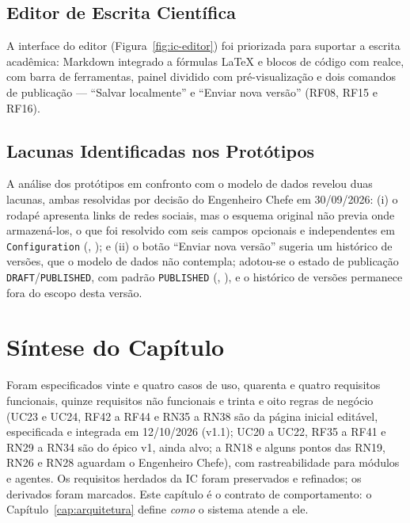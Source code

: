 \subsection{Editor de Escrita Científica}

A interface do editor (Figura~\ref{fig:ic-editor}) foi priorizada para suportar a escrita acadêmica: Markdown integrado a fórmulas \LaTeX{} e blocos de código com realce, com barra de ferramentas, painel dividido com pré-visualização e dois comandos de publicação --- ``Salvar localmente'' e ``Enviar nova versão'' (RF08, RF15 e RF16).


\subsection{Lacunas Identificadas nos Protótipos}

A análise dos protótipos em confronto com o modelo de dados revelou duas lacunas, ambas resolvidas por decisão do Engenheiro Chefe em 30/09/2026: (i) o rodapé apresenta links de redes sociais, mas o esquema original não previa onde armazená-los, o que foi resolvido com seis campos opcionais e independentes em \texttt{Configuration} (, ); e (ii) o botão ``Enviar nova versão'' sugeria um histórico de versões, que o modelo de dados não contempla; adotou-se o estado de publicação \texttt{DRAFT}/\texttt{PUBLISHED}, com padrão \texttt{PUBLISHED} (, ), e o histórico de versões permanece fora do escopo desta versão.

\section{Síntese do Capítulo}

Foram especificados vinte e quatro casos de uso, quarenta e quatro requisitos funcionais, quinze requisitos não funcionais e trinta e oito regras de negócio (UC23 e UC24, RF42 a RF44 e RN35 a RN38 são da página inicial editável, especificada e integrada em 12/10/2026 (v1.1); UC20 a UC22, RF35 a RF41 e RN29 a RN34 são do épico v1, ainda alvo; a RN18 e alguns pontos das RN19, RN26 e RN28 aguardam o Engenheiro Chefe), com rastreabilidade para módulos e agentes. Os requisitos herdados da IC foram preservados e refinados; os derivados foram marcados. Este capítulo é o contrato de comportamento: o Capítulo~\ref{cap:arquitetura} define \emph{como} o sistema atende a ele.
